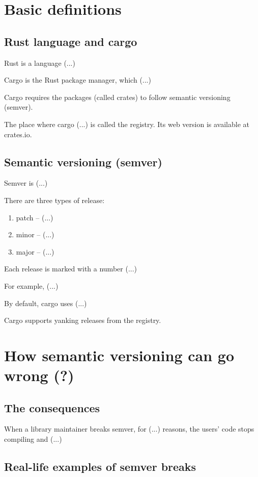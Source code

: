 \documentclass[licencjacka,en]{pracamgr}
\begin{document}
\chapter{Basic definitions}\label{r:definitions}

\section{Rust language and cargo}

Rust is a language (...)

Cargo is the Rust package manager, which (...)

Cargo requires the packages (called crates) to follow semantic versioning (semver).

The place where cargo (...) is called the registry.
Its web version is available at crates.io.

\section{Semantic versioning (semver)}

Semver is (...)

There are three types of release:
\begin{enumerate}
	\item patch -- (...)
	\item minor -- (...)
	\item major -- (...)
\end{enumerate}

Each release is marked with a number (...)

For example, (...)

By default, cargo uses (...)

Cargo supports yanking releases from the registry.

\chapter{How semantic versioning can go wrong (?)}\label{r:idk}

\section{The consequences}

When a library maintainer breaks semver, for (...) reasons, the users' code stops compiling and (...)

\section{Real-life examples of semver breaks}
\end{document}
